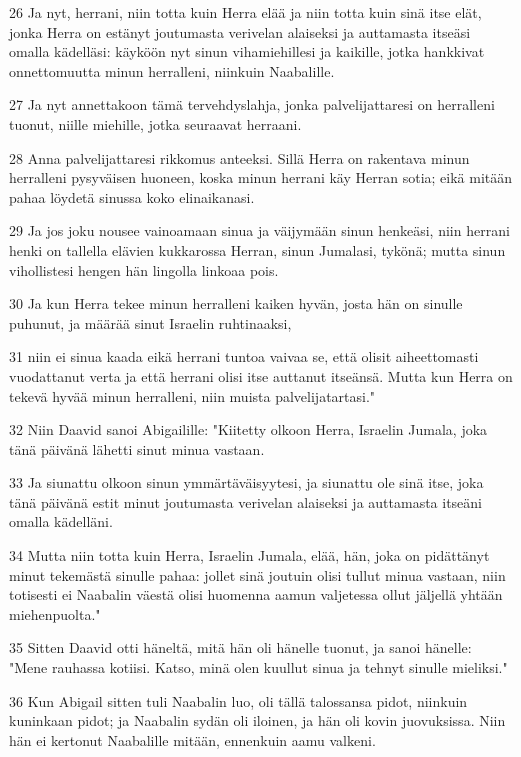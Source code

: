 \par 26 Ja nyt, herrani, niin totta kuin Herra elää ja niin totta kuin sinä itse elät, jonka Herra on estänyt joutumasta verivelan alaiseksi ja auttamasta itseäsi omalla kädelläsi: käyköön nyt sinun vihamiehillesi ja kaikille, jotka hankkivat onnettomuutta minun herralleni, niinkuin Naabalille.
\par 27 Ja nyt annettakoon tämä tervehdyslahja, jonka palvelijattaresi on herralleni tuonut, niille miehille, jotka seuraavat herraani.
\par 28 Anna palvelijattaresi rikkomus anteeksi. Sillä Herra on rakentava minun herralleni pysyväisen huoneen, koska minun herrani käy Herran sotia; eikä mitään pahaa löydetä sinussa koko elinaikanasi.
\par 29 Ja jos joku nousee vainoamaan sinua ja väijymään sinun henkeäsi, niin herrani henki on tallella elävien kukkarossa Herran, sinun Jumalasi, tykönä; mutta sinun vihollistesi hengen hän lingolla linkoaa pois.
\par 30 Ja kun Herra tekee minun herralleni kaiken hyvän, josta hän on sinulle puhunut, ja määrää sinut Israelin ruhtinaaksi,
\par 31 niin ei sinua kaada eikä herrani tuntoa vaivaa se, että olisit aiheettomasti vuodattanut verta ja että herrani olisi itse auttanut itseänsä. Mutta kun Herra on tekevä hyvää minun herralleni, niin muista palvelijatartasi."
\par 32 Niin Daavid sanoi Abigailille: "Kiitetty olkoon Herra, Israelin Jumala, joka tänä päivänä lähetti sinut minua vastaan.
\par 33 Ja siunattu olkoon sinun ymmärtäväisyytesi, ja siunattu ole sinä itse, joka tänä päivänä estit minut joutumasta verivelan alaiseksi ja auttamasta itseäni omalla kädelläni.
\par 34 Mutta niin totta kuin Herra, Israelin Jumala, elää, hän, joka on pidättänyt minut tekemästä sinulle pahaa: jollet sinä joutuin olisi tullut minua vastaan, niin totisesti ei Naabalin väestä olisi huomenna aamun valjetessa ollut jäljellä yhtään miehenpuolta."
\par 35 Sitten Daavid otti häneltä, mitä hän oli hänelle tuonut, ja sanoi hänelle: "Mene rauhassa kotiisi. Katso, minä olen kuullut sinua ja tehnyt sinulle mieliksi."
\par 36 Kun Abigail sitten tuli Naabalin luo, oli tällä talossansa pidot, niinkuin kuninkaan pidot; ja Naabalin sydän oli iloinen, ja hän oli kovin juovuksissa. Niin hän ei kertonut Naabalille mitään, ennenkuin aamu valkeni.
